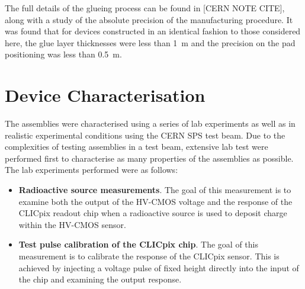 
The full details of the glueing process can be found in [CERN NOTE CITE], along with a study of the absolute precision of the manufacturing procedure.  It was found that for devices constructed in an identical fashion to those considered here, the glue layer thicknesses were less than 1~{\mu}m and the precision on the pad positioning was less than 0.5~{\mu}m.  


\section{Device Characterisation}


The assemblies were characterised using a series of lab experiments as well as in realistic experimental conditions using the CERN SPS test beam.  Due to the complexities of testing assemblies in a test beam, extensive lab test were performed first to characterise as many properties of the assemblies as possible.  The lab experiments performed were as follows:

\begin{itemize}
\item \textbf{Radioactive source measurements}.  The goal of this measurement is to examine both the output of the HV-CMOS voltage and the response of the CLICpix readout chip when a radioactive source is used to deposit charge within the HV-CMOS sensor.  
\item \textbf{Test pulse calibration of the CLICpix chip}.  The goal of this measurement is to calibrate the response of the CLICpix sensor.  This is achieved by injecting a voltage pulse of fixed height directly into the input of the chip and examining the output response.  
\end{itemize} 


